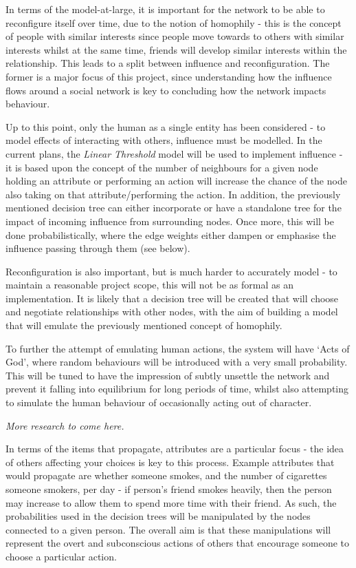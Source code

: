\documentclass[]{article}
\begin{document}
In terms of the model-at-large, it is important for the network to be able to reconfigure itself over time, due to the notion of homophily \cite{USN} - this is the concept of people with similar interests since people move towards to others with similar interests whilst at the same time, friends will develop similar interests within the relationship. This leads to a split between influence and reconfiguration. The former is a major focus of this project, since understanding how the influence flows around a social network is key to concluding how the network impacts behaviour. 

Up to this point, only the human as a single entity has been considered - to model effects of interacting with others, influence must be modelled. In the current plans, the \emph{Linear Threshold} model will be used to implement influence - it is based upon the concept of the number of neighbours for a given node holding an attribute or performing an action will increase the chance of the node also taking on that attribute/performing the action. In addition, the previously mentioned decision tree can either incorporate or have a standalone tree for the impact of incoming influence from surrounding nodes. Once more, this will be done probabilistically, where the edge weights either dampen or emphasise the influence passing through them (see below). 

Reconfiguration is also important, but is much harder to accurately model - to maintain a reasonable project scope, this will not be as formal as an implementation. It is likely that a decision tree will be created that will choose and negotiate relationships with other nodes, with the aim of building a model that will emulate the previously mentioned concept of homophily.

To further the attempt of emulating human actions, the system will have `Acts of God', where random behaviours will be introduced with a very small probability. This will be tuned to have the impression of subtly unsettle the network and prevent it falling into equilibrium for long periods of time, whilst also attempting to simulate the human behaviour of occasionally acting out of character.

\emph{More research to come here.}

In terms of the items that propagate, attributes are a particular focus - the idea of others affecting your choices is key to this process. Example attributes that would propagate are whether someone smokes, and the number of cigarettes someone smokers, per day - if person's friend smokes heavily, then the person may increase to allow them to spend more time with their friend. As such, the probabilities used in the decision trees will be manipulated by the nodes connected to a given person. The overall aim is that these manipulations will represent the overt and subconscious actions of others that encourage someone to choose a particular action.
\end{document}
